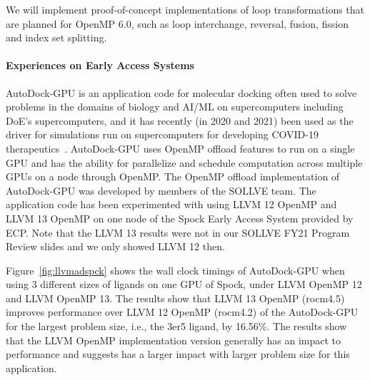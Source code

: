 We will implement proof-of-concept implementations of loop transformations that are planned for OpenMP 6.0, such as loop interchange, reversal, fusion, fission and index set splitting.


\paragraph{Experiences on Early Access Systems}


AutoDock-GPU is an application code for molecular docking often used to solve problems in the domains of biology and AI/ML on supercomputers including DoE's supercomputers, and it has recently (in 2020 and 2021) been used as the driver for simulations run on supercomputers for developing COVID-19 therapeutics~\cite{legrand2020gpu}. AutoDock-GPU uses OpenMP offload features to run on a single GPU and has the ability for parallelize and schedule computation across multiple GPUs on a node through OpenMP. The OpenMP offload implementation of AutoDock-GPU was developed by members of the SOLLVE team. The application code has been experimented with using LLVM 12 OpenMP and LLVM 13 OpenMP on one node of the Spock Early Access System provided by ECP. Note that the LLVM 13 results were not in our SOLLVE FY21 Program Review slides and we only showed LLVM 12 then.

Figure~\ref{fig:llvmadspck} shows the wall clock timings of AutoDock-GPU when using 3 different sizes of ligands on one GPU of Spock, under LLVM OpenMP 12 and LLVM OpenMP 13. The results show that LLVM 13 OpenMP (rocm4.5) improves performance over LLVM 12 OpenMP (rocm4.2) of the AutoDock-GPU for the largest problem size, i.e., the 3er5 ligand, by 16.56\%. The results show that the LLVM OpenMP implementation version generally has an impact to performance and suggests has a larger impact with larger problem size for this application. 

